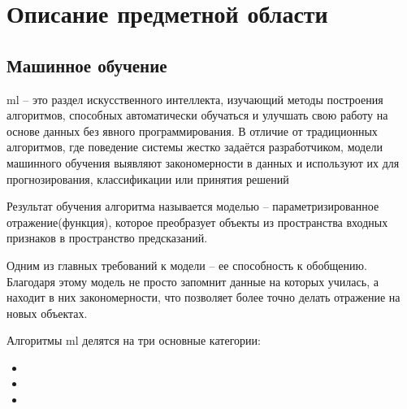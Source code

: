 \documentclass[../document.tex]{subfiles}
\begin{document}
    \section{Описание предметной области}
    \subsection{Машинное обучение}
    \par \acrfull{ml} -- это раздел искусственного интеллекта, изучающий методы построения алгоритмов, способных автоматически обучаться и улучшать свою работу на основе данных без явного программирования. В отличие от традиционных алгоритмов, где поведение системы жестко задаётся разработчиком, модели машинного обучения выявляют закономерности в данных и используют их для прогнозирования, классификации или принятия решений
    \par Результат обучения алгоритма называется моделью -- параметризированное отражение(функция), которое преобразует объекты из пространства входных признаков в пространство предсказаний. 
    \par Одним из главных требований к модели -- ее способность к обобщению. Благодаря этому модель не просто запомнит данные на которых училась, а находит в них закономерности, что позволяет более точно делать отражение на новых объектах.
    \par Алгоритмы \acrshort{ml} делятся на три основные категории:
    \begin{itemize}
        \item {}
        \item {}
        \item {}
    \end{itemize} 

    

    

    

    
    
    
\end{document}
